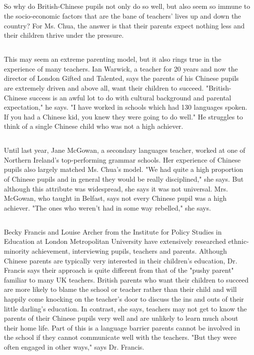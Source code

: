 \documentclass[]{article}
\begin{document}
\begin{spacing}{1.75}
{	\subsection{}
	So why do British-Chinese pupils not only do so well, but also seem so immune to the socio-economic factors that are the bane of teachers' lives up and down the country? For Ms. Chua, the answer is that their parents expect nothing less and their children thrive under the pressure.
	\subsection{}
	This may seem an extreme parenting model, but it also rings true in the experience of many teachers. Ian Warwick, a teacher for 20 years and now the director of London Gifted and Talented, says the parents of his Chinese pupils are extremely driven and above all, want their children to succeed. "British- Chinese success is an awful lot to do with cultural background and parental expectation," he says. "I have worked in schools which had 130 languages spoken. If you had a Chinese kid, you knew they were going to do well." He struggles to think of a single Chinese child who was not a high achiever.
	\subsection{}
	Until last year, Jane McGowan, a secondary languages teacher, worked at one of Northern Ireland's top-performing grammar schools. Her experience of Chinese pupils also largely matched Ms. Chua's model. "We had quite a high proportion of Chinese pupils and in general they would be really disciplined," she says. But although this attribute was widespread, she says it was not universal. Mrs. McGowan, who taught in Belfast, says not every Chinese pupil was a high achiever. "The ones who weren't had in some way rebelled," she says.
	\subsection{}
	Becky Francis and Louise Archer from the Institute for Policy Studies in Education at London Metropolitan University have extensively researched ethnic-minority achievement, interviewing pupils, teachers and parents. Although Chinese parents are typically very interested in their children's education, Dr. Francis says their approach is quite different from that of the "pushy parent" familiar to many UK teachers. British parents who want their children to succeed are more likely to blame the school or teacher rather than their child and will happily come knocking on the teacher's door to discuss the ins and outs of their little darling's education. In contrast, she says, teachers may not get to know the parents of their Chinese pupils very well and are unlikely to learn much about their home life. Part of this is a language barrier parents cannot be involved in the school if they cannot communicate well with the teachers. "But they were often engaged in other ways," says Dr. Francis.
}
\end{spacing}
\end{document}
